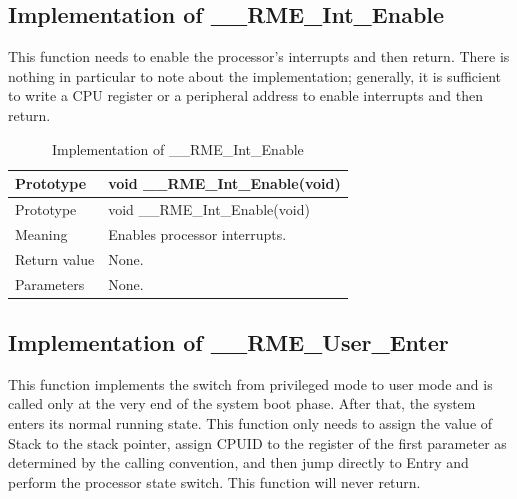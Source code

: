 \subsection{Implementation of \_\_RME\_Int\_Enable}\label{subsec:7-rme-int-enable-implementation}

This function needs to enable the processor's interrupts and then return. There is nothing in particular to note about the implementation; generally, it is sufficient to write a CPU register or a peripheral address to enable interrupts and then return.

\begin{xltabular}{\textwidth}{@{}>{\hsize\raggedright\arraybackslash}X>{\hsize\raggedright\arraybackslash}X@{}}
\caption{Implementation of \_\_RME\_Int\_Enable}\label{tab:7-17-rme-int-enable-implementation}\\
\toprule
Prototype & void \_\_RME\_Int\_Enable(void)\tabularnewline
\endfirsthead
\toprule
Prototype & void \_\_RME\_Int\_Enable(void)\tabularnewline
\midrule
\endhead
\bottomrule
\endlastfoot
Meaning & Enables processor interrupts.\tabularnewline
Return value & None.\tabularnewline
Parameters & None.\tabularnewline
\end{xltabular}
\nopagebreak[4]

\subsection{Implementation of \_\_RME\_User\_Enter}\label{subsec:7-rme-user-enter-implementation}

This function implements the switch from privileged mode to user mode and is called only at the very end of the system boot phase. After that, the system enters its normal running state. This function only needs to assign the value of Stack to the stack pointer, assign CPUID to the register of the first parameter as determined by the calling convention, and then jump directly to Entry and perform the processor state switch. This function will never return.

